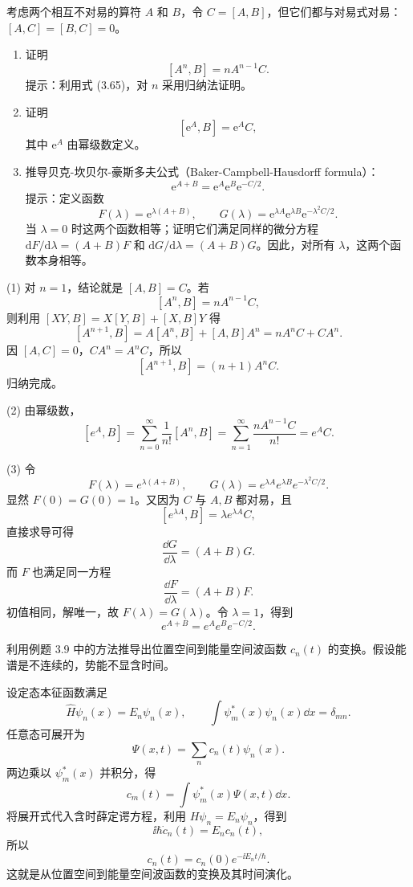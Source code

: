 \begin{question}
考虑两个相互不对易的算符 $A$ 和 $B$，令 $C=[A,B]$，但它们都与对易式对易：$[A,C]=[B,C]=0$。
\begin{enumerate}
\item 证明
\[
[A^n,B]=nA^{n-1}C.
\]
提示：利用式 (3.65)，对 $n$ 采用归纳法证明。
\item 证明
\[
[\mathrm e^A,B]=\mathrm e^A C,
\]
其中 $\mathrm e^A$ 由幂级数定义。
\item 推导贝克-坎贝尔-豪斯多夫公式（Baker-Campbell-Hausdorff formula）：
\[
\mathrm e^{A+B}=\mathrm e^A\mathrm e^B\mathrm e^{-C/2}.
\]
提示：定义函数
\[
F(\lambda)=\mathrm e^{\lambda(A+B)},\qquad
G(\lambda)=\mathrm e^{\lambda A}\mathrm e^{\lambda B}\mathrm e^{-\lambda^2C/2}.
\]
当 $\lambda=0$ 时这两个函数相等；证明它们满足同样的微分方程 $\mathrm dF/\mathrm d\lambda=(A+B)F$ 和 $\mathrm dG/\mathrm d\lambda=(A+B)G$。因此，对所有 $\lambda$，这两个函数本身相等。
\end{enumerate}

\par\smallskip
{}

\end{question}
\begin{solution}
(1) 对 $n=1$，结论就是 $[A,B]=C$。若
\[
[A^n,B]=nA^{n-1}C,
\]
则利用 $[XY,B]=X[Y,B]+[X,B]Y$ 得
\[
[A^{n+1},B]=A[A^n,B]+[A,B]A^n
=nA^nC+CA^n.
\]
因 $[A,C]=0$，$CA^n=A^nC$，所以
\[
[A^{n+1},B]=(n+1)A^nC.
\]
归纳完成。

(2) 由幂级数，
\[
[e^A,B]=\sum_{n=0}^{\infty}\frac1{n!}[A^n,B]
=\sum_{n=1}^{\infty}\frac{nA^{n-1}C}{n!}
=e^A C.
\]

(3) 令
\[
F(\lambda)=e^{\lambda(A+B)},
\qquad
G(\lambda)=e^{\lambda A}e^{\lambda B}e^{-\lambda^2C/2}.
\]
显然 $F(0)=G(0)=1$。又因为 $C$ 与 $A,B$ 都对易，且
\[
[e^{\lambda A},B]=\lambda e^{\lambda A}C,
\]
直接求导可得
\[
\frac{\dd G}{\dd\lambda}=(A+B)G.
\]
而 $F$ 也满足同一方程
\[
\frac{\dd F}{\dd\lambda}=(A+B)F.
\]
初值相同，解唯一，故 $F(\lambda)=G(\lambda)$。令 $\lambda=1$，得到
\[
\boxed{e^{A+B}=e^Ae^Be^{-C/2}.}
\]
\end{solution}

\begin{question}
利用例题 3.9 中的方法推导出位置空间到能量空间波函数 $c_n(t)$ 的变换。假设能谱是不连续的，势能不显含时间。
\end{question}
\begin{solution}
设定态本征函数满足
\[
\hat H\psi_n(x)=E_n\psi_n(x),
\qquad
\int\psi_m^*(x)\psi_n(x)\dd x=\delta_{mn}.
\]
任意态可展开为
\[
\Psi(x,t)=\sum_n c_n(t)\psi_n(x).
\]
两边乘以 $\psi_m^*(x)$ 并积分，得
\[
\boxed{c_m(t)=\int\psi_m^*(x)\Psi(x,t)\dd x.}
\]
将展开式代入含时薛定谔方程，利用 $H\psi_n=E_n\psi_n$，得到
\[
\ii\hbar\dot c_n(t)=E_n c_n(t),
\]
所以
\[
\boxed{c_n(t)=c_n(0)e^{-\ii E_nt/\hbar}.}
\]
这就是从位置空间到能量空间波函数的变换及其时间演化。
\end{solution}

